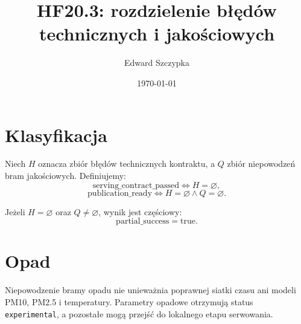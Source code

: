\documentclass[11pt,a4paper]{article}
\title{HF20.3: rozdzielenie błędów technicznych i jakościowych}
\author{Edward Szczypka}
\date{\today}
\begin{document}
\maketitle

\section{Klasyfikacja}

Niech \(H\) oznacza zbiór błędów technicznych kontraktu, a \(Q\) zbiór
niepowodzeń bram jakościowych. Definiujemy:
\[
  \mathrm{serving\_contract\_passed} \iff H=\varnothing,
\]
\[
  \mathrm{publication\_ready} \iff H=\varnothing \land Q=\varnothing.
\]

Jeżeli \(H=\varnothing\) oraz \(Q\neq\varnothing\), wynik jest częściowy:
\[
  \mathrm{partial\_success}=\mathrm{true}.
\]

\section{Opad}

Niepowodzenie bramy opadu nie unieważnia poprawnej siatki czasu ani modeli
PM10, PM2.5 i temperatury. Parametry opadowe otrzymują status
\texttt{experimental}, a pozostałe mogą przejść do lokalnego etapu
serwowania.
\end{document}
